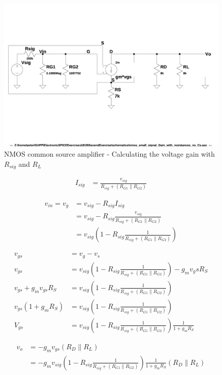 \documentclass[10pt,a4paper]{book}
\begin{document}
\begin{figure}[h]
  \centering
  \includegraphics[width=12cm]{schematics/nmos_small_signal_with_resistances_no_Cs.jpg}
  \caption{NMOS common source amplifier - Calculating the voltage gain with $R_{sig}$ and $R_L$}
  \label{nmos_pi_gain_with_resistances_no_Cs}
\end{figure}

\begin{align}
I_{sig} &= \frac{v_{sig}}{R_{sig} + (R_{G1} \parallel R_{G2})}
\end{align}

\begin{align}
v_{in} = v_{g} &= v_{sig} - R_{sig} I_{sig}\\
&= v_{sig} - R_{sig} \frac{v_{sig}}{R_{sig} + (R_{G1} \parallel R_{G2})}\\
&= v_{sig} \left(1 - R_{sig} \frac{1}{R_{sig} + (R_{G1} \parallel R_{G2})}\right)
\end{align}

\begin{align}
v_{gs} &= v_g - v_s\\
v_{gs} &= v_{sig} \left(1 - R_{sig} \frac{1}{R_{sig} + (R_{G1} \parallel R_{G2})}\right) - g_m v_gs R_S\\
v_{gs} + g_m v_{gs} R_S &= v_{sig} \left(1 - R_{sig} \frac{1}{R_{sig} + (R_{G1} \parallel R_{G2})}\right)\\
v_{gs} (1+ g_m R_S) &= v_{sig} \left(1 - R_{sig} \frac{1}{R_{sig} + (R_{G1} \parallel R_{G2})}\right)\\
V_{gs} &= v_{sig} \left(1 - R_{sig} \frac{1}{R_{sig} + (R_{G1} \parallel R_{G2})}\right) \frac{1}{1+ g_m R_S}
\end{align}

\begin{align}
v_o &= - g_m v_{gs} (R_D \parallel R_L)\\
&= -g_m v_{sig} \left(1 - R_{sig} \frac{1}{R_{sig} + (R_{G1} \parallel R_{G2})}\right) \frac{1}{1+ g_m R_S} (R_D \parallel R_L)
\end{align}
\end{document}
